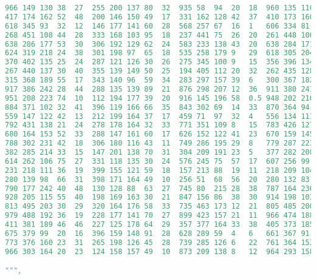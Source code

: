 \begin{lstlisting}[language=python]
966	149	130	38	27	255	200	137	80	32	935	58	94	20	18	960	135	116	23	24
417	174	162	52	48	200	146	150	49	17	331	162	128	42	37	410	173	160	52	39
618	345	93	32	12	146	177	141	60	28	568	257	67	16	1	606	334	81	19	2
268	451	108	44	28	333	168	103	95	18	237	441	75	26	20	261	448	106	32	16
638	286	177	53	30	306	192	129	62	24	583	233	138	43	20	638	284	171	39	26
624	319	218	24	38	301	198	97	65	18	535	258	179	9	29	618	305	204	12	36
370	402	135	25	24	287	121	126	30	26	275	345	100	9	15	356	396	134	19	20
267	440	137	30	40	355	139	149	50	25	194	405	112	20	32	262	435	128	28	36
315	368	189	55	17	343	140	96	59	34	283	297	157	39	6	300	367	182	44	5
917	386	242	28	44	288	135	139	89	21	876	298	207	12	36	911	380	241	20	41
951	208	223	74	10	112	194	177	39	20	916	145	196	58	0.5	948	202	216	72	8
884	371	102	32	41	396	119	166	66	35	843	302	69	14	33	870	364	94	26	32
559	147	122	42	13	212	199	164	37	17	459	71	97	32	4	556	134	111	39	0
792	431	138	21	24	278	178	164	32	33	771	351	109	8	15	783	426	127	11	23
680	164	153	52	33	288	147	161	60	17	626	152	122	41	23	670	159	145	46	22
788	302	231	42	18	306	180	116	43	11	749	286	195	29	8	779	287	223	34	9
382	285	214	33	15	147	201	138	70	31	304	209	191	23	5	377	282	208	30	0
614	262	106	75	27	331	118	135	30	24	576	245	75	57	17	607	256	99	66	17
231	218	111	36	19	399	155	121	59	18	157	213	88	19	11	218	209	104	25	16
280	139	98	66	31	398	171	164	49	10	256	51	68	56	20	280	132	83	62	19
790	177	242	40	48	130	128	88	63	27	745	80	215	28	38	787	164	236	35	42
928	205	115	55	40	198	169	163	30	21	847	156	86	38	30	914	198	103	46	26
813	495	203	30	29	320	164	176	58	33	735	463	173	12	21	805	485	200	18	29
979	488	192	36	19	228	177	141	70	27	899	423	157	21	11	966	474	188	27	4
411	381	189	46	46	227	125	178	64	29	357	377	164	33	38	405	373	185	32	31
675	379	99	20	16	396	159	148	91	28	628	289	59	4	6	661	367	91	19	12
773	376	160	23	31	265	198	126	45	28	739	285	126	6	22	761	364	153	9	25
966	303	164	20	23	124	158	157	49	10	873	209	138	8	12	964	293	158	11	22

""",


\end{lstlisting}

